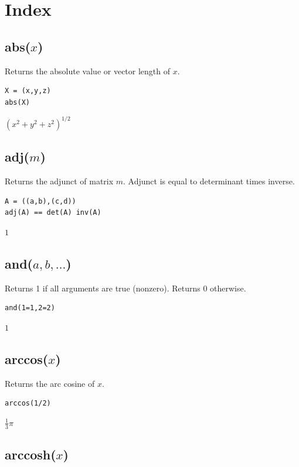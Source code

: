 \documentclass[12pt]{article}
\begin{document}
\newpage

\section{Index}

\subsection*{abs($x$)}

Returns the absolute value or vector length of $x$.

{\color{blue}
\begin{verbatim}
X = (x,y,z)
abs(X)
\end{verbatim}
}

$\left(x^2+y^2+z^2\right)^{1/2}$

\subsection*{adj($m$)}

Returns the adjunct of matrix $m$.
Adjunct is equal to determinant times inverse.

{\color{blue}
\begin{verbatim}
A = ((a,b),(c,d))
adj(A) == det(A) inv(A)
\end{verbatim}
}

$1$

\subsection*{and($a,b,\ldots$)}

Returns 1 if all arguments are true (nonzero).
Returns 0 otherwise.

{\color{blue}
\begin{verbatim}
and(1=1,2=2)
\end{verbatim}
}

$1$

\subsection*{arccos($x$)}

Returns the arc cosine of $x$.

{\color{blue}
\begin{verbatim}
arccos(1/2)
\end{verbatim}
}

$\tfrac{1}{3}\pi$

\subsection*{arccosh($x$)}
\end{document}

